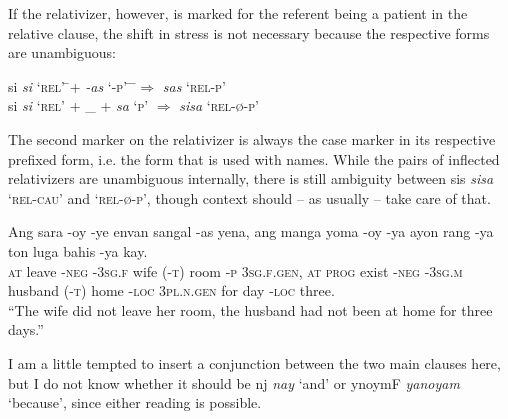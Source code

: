 \documentclass[12pt,paper=letter]{scrartcl}
\newcommand{\fw}[1]{\textit{#1}} %
\newcommand{\q}[1]{\enquote{#1}} %
\newcommand{\qq}[1]{\enquote*{#1}} %
\newcommand{\divider}{
    \vspace{\baselineskip}
}
\newcommand{\mor}[1]{\textsc{\lowercase{#1}}}
\newcommand{\ayr}[1]{{\Tagati #1}}
\begin{document}
If the relativizer, however, is marked for the referent being a patient in the 
relative clause, the shift in stress is not necessary because the respective
forms are unambiguous:

\begin{exe}
    \exi{}
    \begin{xlist}
	 \begin{tabbing}
	    \ayr{si} \fw{si} \qq{\mor{REL}}
		\= \enskip + \enskip \ayr{/AsF} \fw{-as} \qq{\mor{-P}} \hspace{1.5em}
		\= \hspace{7em}
		\= \enskip $\Rightarrow$ \enskip \ayr{ssF} \fw{sas} \qq{\mor{REL-P}} \\
	    \ayr{si} \fw{si} \qq{\mor{REL}}
		\> \enskip + \enskip \_\fakesubscript{\mor{case}}
		\> \enskip + \enskip \ayr{s} \fw{sa} \qq{\mor{P}}
		\> \enskip $\Rightarrow$ \enskip \ayr{sis} \fw{sisa} \qq{\mor{REL-Ø-P}}
	\end{tabbing}
    \end{xlist}
\end{exe}

The second marker on the relativizer is always the case marker in its respective
prefixed form, i.e. the form that is used with names. While the pairs of 
inflected relativizers are unambiguous internally, there is still ambiguity 
between \ayr{sis} \fw{sisa} \qq{\mor{REL-CAU}} and \qq{\mor{REL-Ø-P}}, though
context should -- as usually -- take care of that.

\divider

\begin{exe}  %
    \ex \gll Ang sara -oy -ye envan {} sangal -as yena, ang manga yoma -oy -ya 
	ayon {} rang -ya ton luga bahis -ya kay. \\
    \mor{AT} leave \mor{-NEG} \mor{-3SG.F} wife \mor{(-T)} room \mor{-P} 
    \mor{3SG.F.GEN}, \mor{AT} \mor{PROG} exist \mor{-NEG} \mor{-3SG.M} 
	husband \mor{(-T)} home \mor{-LOC} \mor{3PL.N.GEN} for day \mor{-LOC} 
	three. \\
    \glt \q{The wife did not leave her room, the husband had not been at home 
	for three days.}
\end{exe}

I am a little tempted to insert a conjunction between the two main clauses here,
but I do not know whether it should be \ayr{nj} \fw{nay} \qq{and} or \ayr{ynoymF}
\fw{yanoyam} \qq{because}, since either reading is possible.

\divider
\end{document}
